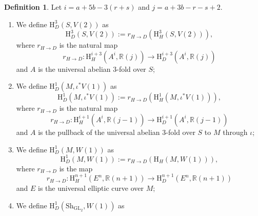 \documentclass[11pt, a4paper]{amsart}
\theoremstyle{plain}
\theoremstyle{definition}
\newtheorem{definition}[theorem]{Definition}
\numberwithin{equation}{section}
\def\RR{\mathbb{R}}
\DeclareMathOperator{\GL}{\mathrm{GL}}
\newcommand{\Sh}{\mathrm{Sh}}
\begin{document}
\begin{definition}
\label{Def: DB-coh with coefficients}
    Let $i = a + 5b - 3(r + s)$ and $j = a + 3b -r - s + 2$. 
    \begin{enumerate}
        \item We define $\mathrm{H}^{3}_{D}(S, V(2))$ as 
              \begin{equation*}
                    \mathrm{H}^{3}_{D}(S, V(2)) := r_{H \rightarrow D} (\mathrm{H}^{3}_{H}(S, V(2))), 
              \end{equation*}
               where $r_{H \rightarrow D}$ is the natural map 
               \begin{equation*}
                   r_{H \rightarrow D} \colon \mathrm{H}_{H}^{i + 3}(A^{i}, \RR(j)) \rightarrow \mathrm{H}_{D}^{i + 3}(A^{i}, \RR(j))
               \end{equation*}
               and $A$ is the universal abelian $3$-fold over $S$;
        \item We define $\mathrm{H}^{1}_{D}(M, \iota^{*}V(1))$ as 
              \begin{equation*}
                    \mathrm{H}^{1}_{D}(M, \iota^{*}V(1)) := r_{H \rightarrow D} (\mathrm{H}^{1}_{H}(M, \iota^{*}V(1))), 
              \end{equation*}
               where $r_{H \rightarrow D}$ is the natural map 
               \begin{equation*}
                   r_{H \rightarrow D} \colon \mathrm{H}_{H}^{i + 1}(A^{i}, \RR(j - 1)) \rightarrow \mathrm{H}_{D}^{i + 1}(A^{i}, \RR(j - 1))
               \end{equation*}
               and $A$ is the pullback of the universal abelian $3$-fold over $S$ to $M$ through $\iota$;
        \item We define $\mathrm{H}^{1}_{D}(M, W(1))$ as 
              \begin{equation*}
                    \mathrm{H}^{1}_{D}(M, W(1)) := r_{H \rightarrow D}(\mathrm{H}_{H}(M, W(1))), 
              \end{equation*}
              where $r_{H \rightarrow D}$ is the map 
              \begin{equation*}
                  r_{H \rightarrow D} \colon \mathrm{H}^{n + 1}_{H} (E^{n}, \RR(n + 1)) \rightarrow \mathrm{H}^{n + 1}_{D} (E^{n}, \RR(n + 1))
              \end{equation*}
              and $E$ is the universal elliptic curve over $M$; 
        \item We define $\mathrm{H}^{1}_{D}(\Sh_{\GL_2}, W(1))$ as

\end{enumerate}
\end{definition}
\end{document}
